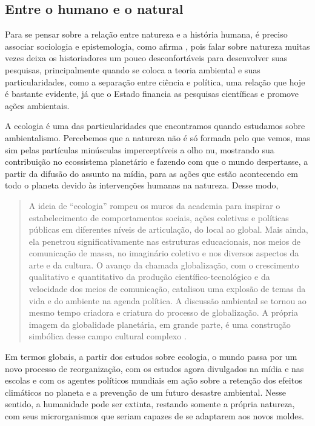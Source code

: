 \begin{refsection}
    \section{Entre o humano e o natural}

    Para se pensar sobre a relação entre natureza e a história humana, é preciso associar sociologia e epistemologia, como afirma \textcite{PÁDUA2010bases}, pois falar sobre natureza muitas vezes deixa os historiadores um pouco desconfortáveis para desenvolver suas pesquisas, principalmente quando se coloca a teoria ambiental e suas particularidades, como a separação entre ciência e política, uma relação que hoje é bastante evidente, já que o Estado financia as pesquisas científicas e promove ações ambientais.  

    A ecologia é uma das particularidades que encontramos quando estudamos sobre ambientalismo. Percebemos que a natureza não é só formada pelo que vemos, mas sim pelas partículas minúsculas imperceptíveis a olho nu, mostrando sua contribuição no ecossistema planetário e fazendo com que o mundo despertasse, a partir da difusão do assunto na mídia, para as ações que estão acontecendo em todo o planeta devido às intervenções humanas na natureza. Desse modo, 

    \begin{quotation}
        A ideia de “ecologia” rompeu os muros da academia para inspirar o estabelecimento de comportamentos sociais, ações coletivas e políticas públicas em diferentes níveis de articulação, do local ao global. Mais ainda, ela penetrou significativamente nas estruturas educacionais, nos meios de comunicação de massa, no imaginário coletivo e nos diversos aspectos da arte e da cultura. O avanço da chamada globalização, com o crescimento qualitativo e quantitativo da produção científico-tecnológico e da velocidade dos meios de comunicação, catalisou uma explosão de temas da vida e do ambiente na agenda política. A discussão ambiental se tornou ao mesmo tempo criadora e criatura do processo de globalização. A própria imagem da globalidade planetária, em grande parte, é uma construção simbólica desse campo cultural complexo \cite[p.~82]{PÁDUA2010bases}. 
    \end{quotation}

    Em termos globais, a partir dos estudos sobre ecologia, o mundo passa por um novo processo de reorganização, com os estudos agora divulgados na mídia e nas escolas e com os agentes políticos mundiais em ação sobre a retenção dos efeitos climáticos no planeta e a prevenção de um futuro desastre ambiental. Nesse sentido, a humanidade pode ser extinta, restando somente a própria natureza, com seus microrganismos que seriam capazes de se adaptarem aos novos moldes.  


\end{refsection}
